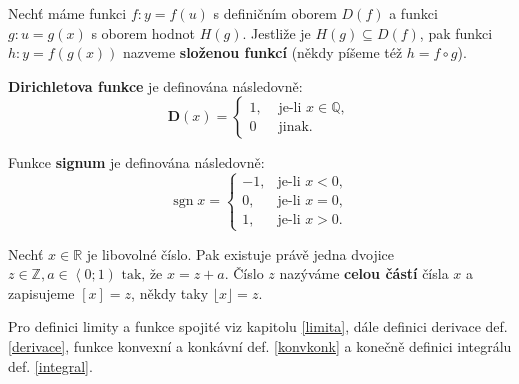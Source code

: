 \begin{definition}
  Nechť máme funkci $f: y = f(u)$ s definičním oborem $D(f)$ a funkci $g: u=g(x)$ s oborem hodnot $H(g)$. Jestliže je $H(g) \subseteq D(f)$, pak funkci $h: y = f(g(x))$ nazveme \textbf{složenou funkcí} (někdy píšeme též $h=f \circ g$).
\end{definition}

\begin{definition}
  \textbf{Dirichletova funkce} je definována následovně:
  $$\mathbf{D} (x) = \begin{cases}
1, & \text{ je-li } x \in \mathbb Q, \\
0 & \text{ jinak}.
  \end{cases}  $$
\end{definition}

\begin{definition}
  Funkce \textbf{signum} je definována následovně: $$\operatorname {sgn} x={\begin{cases}-1,& \textrm{je-li }x<0,\\0,&\textrm{je-li }x=0,\\1,&\textrm{je-li }x>0.\end{cases}}$$
\end{definition}

\begin{definition}
  Nechť $x \in \mathbb{R}$ je libovolné číslo. Pak existuje právě jedna dvojice $z \in \mathbb{Z}, a \in \left \langle 0;1 \right) \text{ tak, že } x = z + a$.
Číslo $z$ nazýváme \textbf{celou částí} čísla $x$ a zapisujeme $[x] = z$, někdy taky $\lfloor x \rfloor = z$.
\end{definition}

\begin{pozn}
    Pro definici limity a funkce spojité viz kapitolu \ref{limita},
    dále definici derivace def. \ref{derivace}, funkce konvexní a
    konkávní def. \ref{konvkonk} a konečně definici integrálu def. \ref{integral}.
\end{pozn}
